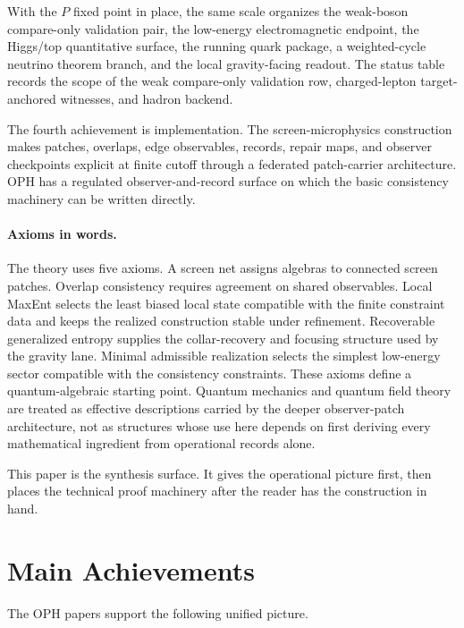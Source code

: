 \documentclass[11pt]{article}
\begin{document}
With the \(P\) fixed point in place, the same scale organizes the weak-boson compare-only validation pair,
the low-energy electromagnetic endpoint, the Higgs/top quantitative surface, the running quark package,
a weighted-cycle neutrino theorem branch, and the local gravity-facing readout. The status table records the scope of the
weak compare-only validation row, charged-lepton target-anchored witnesses, and hadron backend.

The fourth achievement is implementation. The screen-microphysics construction makes patches,
overlaps, edge observables, records, repair maps, and observer checkpoints explicit at finite
cutoff through a federated patch-carrier architecture. OPH has a regulated observer-and-record surface on which the basic consistency
machinery can be written directly.

\paragraph{Axioms in words.}
The theory uses five axioms. A screen net assigns algebras to connected screen patches. Overlap
consistency requires agreement on shared observables. Local MaxEnt selects the least biased local
state compatible with the finite constraint data and keeps the realized construction stable under
refinement. Recoverable generalized entropy supplies the collar-recovery and focusing structure
used by the gravity lane. Minimal admissible realization selects the simplest low-energy sector
compatible with the consistency constraints. These axioms define a quantum-algebraic
starting point. Quantum mechanics and quantum field theory are treated as effective descriptions
carried by the deeper observer-patch architecture, not as structures whose use here depends on
first deriving every mathematical ingredient from operational records alone.

This paper is the synthesis surface. It gives the operational picture first, then places the
technical proof machinery after the reader has the construction in hand.

\section{Main Achievements}

The OPH papers support the following unified picture.
\end{document}

